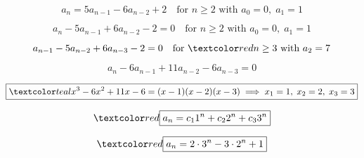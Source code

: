 \begin{frame}{}
  \[
    a_n = 5a_{n-1} - 6a_{n-2} + 2 \quad \text{for } n \ge 2 \text{ with } a_0 = 0,\; a_1 = 1
  \]

  \pause
  \[
    a_n - 5a_{n-1} + 6a_{n-2} - 2 = 0 \quad \text{for } n \ge 2 \text{ with } a_0 = 0,\; a_1 = 1
  \]

  \pause
  \[
    a_{n-1} - 5a_{n-2} + 6a_{n-3} - 2 = 0 \quad \text{for } \red{n \ge 3 \text{ with } a_2 = 7}
  \]

  \pause
  \[
    a_n - 6a_{n-1} + 11a_{n-2} - 6a_{n-3} = 0
  \]

  \pause
  \[
    \boxed{\teal{x^3 - 6x^2 + 11x - 6} = (x-1) (x-2) (x-3) \implies x_1 = 1,\; x_2 = 2,\; x_3 = 3}
  \]

  \pause
  \[
    \red{\boxed{a_n = c_1 1^n + c_2 2^n + c_3 3^n}}
  \]

  \pause
  \[
    \red{\boxed{a_n = 2 \cdot 3^n - 3 \cdot 2^n + 1}}
  \]
\end{frame}
